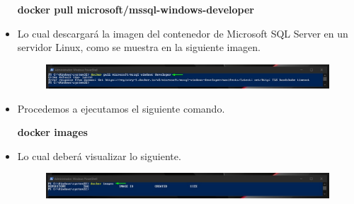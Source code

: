 \begin{itemize}
						\begin{center}
							\textbf{docker pull microsoft/mssql-windows-developer} \\
						\end{center}
					\item Lo cual descargará la imagen del contenedor de Microsoft SQL Server en un servidor Linux, como se muestra en la siguiente imagen.
						\begin{figure}[htb]						
							\begin{center}
								\includegraphics[width=19cm]{./Imagenes/Comando015}
							\end{center}
						\end{figure}
					\item Procedemos a ejecutamos el siguiente comando.
						\begin{center}
							\textbf{docker images} \\
						\end{center}
					\item Lo cual deberá visualizar lo siguiente.
						\begin{figure}[htb]						
							\begin{center}
								\includegraphics[width=19cm]{./Imagenes/Comando016}
							\end{center}
						\end{figure}
	\end{itemize}
